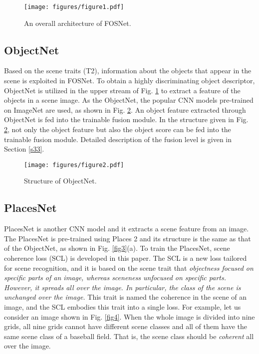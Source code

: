 \documentclass[journal,comsoc]{IEEEtran}
\begin{document}
\begin{figure}[!t]
\centering
\texttt{[image: figures/figure1.pdf]}
\caption{An overall architecture of FOSNet.}
\label{fig1}
\end{figure}


\subsection{ObjectNet}
\label{s31}
Based on the scene traits (T2), information about the objects that appear in the scene is exploited in FOSNet. To obtain a highly discriminating object descriptor, ObjectNet is utilized in the upper stream of Fig. \ref{fig1} to extract a feature of the objects in a scene image. As the ObjectNet, the popular CNN models \cite{b23,b26,b27,b28} pre-trained on ImageNet \cite{b19} are used, as shown in Fig. \ref{fig2}. An object feature extracted through ObjectNet is fed into the trainable fusion module. In the structure given in Fig. \ref{fig2}, not only the object feature but also the object score can be fed into the trainable fusion module. Detailed description of the fusion level is given in Section \ref{s33}.

\begin{figure}[!t]
\centering
\texttt{[image: figures/figure2.pdf]}
\caption{Structure of ObjectNet.}
\label{fig2}
\end{figure}

\subsection{PlacesNet}
\label{s32}

PlacesNet is another CNN model and it extracts a scene feature from an image. The PlacesNet is pre-trained using Places 2 \cite{b20} and its structure is the same as that of the ObjectNet, as shown in Fig. \ref{fig3}(a). To train the PlacesNet, scene coherence loss (SCL) is developed in this paper. The SCL is a new loss tailored for scene recognition, and it is based on the scene trait that \textit{objectness focused on specific parts of an image, whereas sceneness unfocused on specific parts. However, it spreads all over the image. In particular, the class of the scene is unchanged over the image.} This trait is named the coherence in the scene of an image, and the SCL embodies this trait into a single loss. For example, let us consider an image shown in Fig. \ref{fig4}. When the whole image is divided into nine grids, all nine grids cannot have different scene classes and all of them have the same scene class of a baseball field. That is, the scene class should be \textit{coherent} all over the image.
\end{document}

